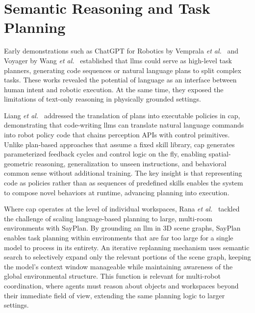 \documentclass[
     12pt,
     a4paper,
     BCOR=10mm,
     DIV=14,
     listof=totoc,
     bibliography=totoc,
     parskip,
     twoside,
     headsepline
     ]{scrreprt}
\begin{document}
\section{Semantic Reasoning and Task Planning}
Early demonstrations such as ChatGPT for Robotics by Vemprala \emph{et al.}~\cite{vemprala2023chatgptroboticsdesignprinciples} and Voyager by Wang \emph{et al.}~\cite{wang2023voyageropenendedembodiedagent} established that \gls{llm}s could serve as high-level task planners, generating code sequences or natural language plans to split complex tasks. These works revealed the potential of language as an interface between human intent and robotic execution. At the same time, they exposed the limitations of text-only reasoning in physically grounded settings.

Liang \emph{et al.}~\cite{liang2023codepolicieslanguagemodel} addressed the translation of plans into executable policies in \gls{cap}, demonstrating that code-writing \gls{llm}s can translate natural language commands into robot policy code that chains perception APIs with control primitives. Unlike plan-based approaches that assume a fixed skill library, \gls{cap} generates parameterized feedback cycles and control logic on the fly, enabling spatial-geometric reasoning, generalization to unseen instructions, and behavioral common sense without additional training. The key insight is that representing code as policies rather than as sequences of predefined skills enables the system to compose novel behaviors at runtime, advancing planning into execution.

Where \gls{cap} operates at the level of individual workspaces, Rana \emph{et al.}~\cite{rana2023sayplangroundinglargelanguage} tackled the challenge of scaling language-based planning to large, multi-room environments with SayPlan. By grounding an \gls{llm} in 3D scene graphs, SayPlan enables task planning within environments that are far too large for a single model to process in its entirety. An iterative replanning mechanism uses semantic search to selectively expand only the relevant portions of the scene graph, keeping the model's context window manageable while maintaining awareness of the global environmental structure. This function is relevant for multi-robot coordination, where agents must reason about objects and workspaces beyond their immediate field of view, extending the same planning logic to larger settings.

\end{document}

